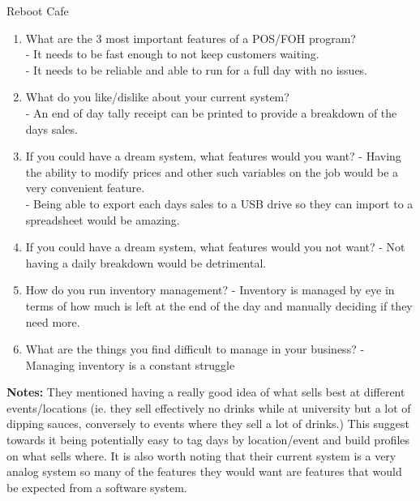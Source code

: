 {\large Reboot Cafe \par}
\begin{enumerate}
	\item What are the 3 most important features of a POS/FOH program?\\
	 - It needs to be fast enough to not keep customers waiting.\\
	 - It needs to be reliable and able to run for a full day with no issues.
	\item What do you like/dislike about your current system?\\
	 - An end of day tally receipt can be printed to provide a breakdown of the days sales.
	\item If you could have a dream system, what features would you want?
	 - Having the ability to modify prices and other such variables on the job would be a very convenient feature.\\
	 - Being able to export each days sales to a USB drive so they can import to a spreadsheet would be amazing.
	\item If you could have a dream system, what features would you not want?
	 - Not having a daily breakdown would be detrimental.
	\item How do you run inventory management?
	 - Inventory is managed by eye in terms of how much is left at the end of the day and manually deciding if they need more.
	\item What are the things you find difficult to manage in your business?
	 - Managing inventory is a constant struggle
\end{enumerate}

\textbf{Notes:}
They mentioned having a really good idea of what sells best at different events/locations (ie. they sell effectively no drinks while at university but a lot of dipping sauces, conversely to events where they sell a lot of drinks.) This suggest towards it being potentially easy to tag days by location/event and build profiles on what sells where. It is also worth noting that their current system is a very analog system so many of the features they would want are features that would be expected from a software system.

